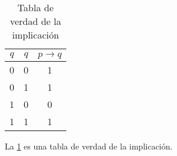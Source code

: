 \documentclass{article}
\begin{document}
\lipsum[1-2]

\begin{table}[H]
  \centering
  \begin{tabular}{|c|c|c|}
    \hline
    $q$ & $q$ & $p \to  q$ \\
    \hline
    0 & 0 & 1\\
    0 & 1 & 1\\
    \cline{1-2}
    1 & 0 & 0\\
    1 & 1 & 1\\
    \hline
  \end{tabular}
  \caption{Tabla de verdad de la implicación}
  \label{tab:implicacion}
\end{table}

La \ref{tab:implicacion} es una tabla de verdad de la implicación.
\end{document}
